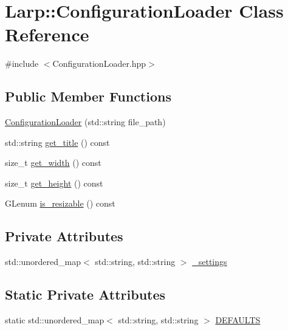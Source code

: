 \hypertarget{classLarp_1_1ConfigurationLoader}{}\section{Larp\+:\+:Configuration\+Loader Class Reference}
\label{classLarp_1_1ConfigurationLoader}


{\ttfamily \#include $<$Configuration\+Loader.\+hpp$>$}

\subsection*{Public Member Functions}
\begin{DoxyCompactItemize}
\item 
\hyperlink{classLarp_1_1ConfigurationLoader_a56c72334b1d45ba36ec438d249ae7324}{Configuration\+Loader} (std\+::string file\+\_\+path)
\item 
std\+::string \hyperlink{classLarp_1_1ConfigurationLoader_a183f5d7ea7af3138ac6858de71333632}{get\+\_\+title} () const 
\item 
size\+\_\+t \hyperlink{classLarp_1_1ConfigurationLoader_abc3b910d211aabeb36972f864534f182}{get\+\_\+width} () const 
\item 
size\+\_\+t \hyperlink{classLarp_1_1ConfigurationLoader_a780a48cf2f6d3396ea846fc1a2995b9d}{get\+\_\+height} () const 
\item 
G\+Lenum \hyperlink{classLarp_1_1ConfigurationLoader_a164ed479f1a77417c799f62a92204690}{is\+\_\+resizable} () const 
\end{DoxyCompactItemize}
\subsection*{Private Attributes}
\begin{DoxyCompactItemize}
\item 
std\+::unordered\+\_\+map$<$ std\+::string, std\+::string $>$ \hyperlink{classLarp_1_1ConfigurationLoader_ab952b0b19ffa465a73fd58302fccb124}{\+\_\+settings}
\end{DoxyCompactItemize}
\subsection*{Static Private Attributes}
\begin{DoxyCompactItemize}
\item 
static std\+::unordered\+\_\+map$<$ std\+::string, std\+::string $>$ \hyperlink{classLarp_1_1ConfigurationLoader_a5b5d1d47f1f5cced025a85d248ae57e7}{D\+E\+F\+A\+U\+L\+TS}
\end{DoxyCompactItemize}


